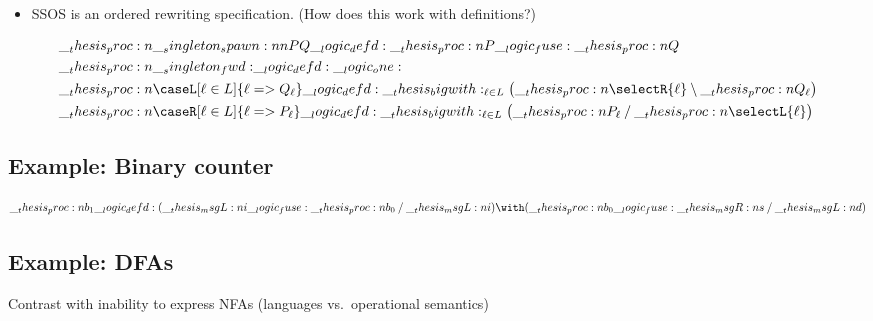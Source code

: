 

\begin{itemize}
\item SSOS is an ordered rewriting specification.  (How does this work with definitions?)
\end{itemize}

\begin{equation*}
  \begin{lgathered}
    \proc{\spawn{P}{Q}} \defd \proc{P} \fuse \proc{Q} \\
    \proc{\fwd} \defd \one \\
    \proc{\caseL[\ell \in L]{\ell => Q_{\ell}}} \defd \bigwith_{\ell \in L}\bigl(\proc{\selectR{\ell}} \limp \proc{Q_{\ell}}\bigr) \\
    \proc{\caseR[\ell \in L]{\ell => P_{\ell}}} \defd \bigwith_{\ell \in L}\bigl(\proc{P_{\ell}} \pmir \proc{\selectL{\ell}}\bigr)
  \end{lgathered}
\end{equation*}

\subsection{Example: Binary counter}

\begin{equation*}
  \proc{b_1} \defd (\msgL{i} \fuse \proc{b_0} \pmir \msgL{i}) \with (\proc{b_0} \fuse \msgR{s} \pmir \msgL{d})
\end{equation*}

\subsection{Example: \Aclp*{DFA}}

Contrast with inability to express \acp{NFA} (languages vs.\ operational semantics)

